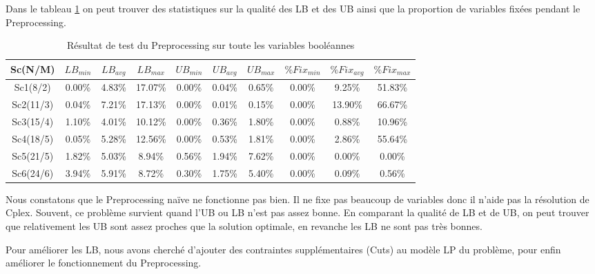\documentclass[twoside,fleqn]{EPURapport}
\begin{document}
Dans le tableau \ref{tab_pre} on peut trouver des statistiques sur la qualité des LB et des UB ainsi que la proportion de variables fixées pendant le Preprocessing.
\bigskip
\begin{table}[h]
    \centering
    \begin{tabular}{|c|c|c|c|c|c|c|c|c|c|}
    	\hline
    	Sc(N/M)	& $LB_{min}$ & $LB_{avg}$ & $LB_{max}$ & $UB_{min}$ & $UB_{avg}$ & $UB_{max}$ & $\%Fix_{min}$ & $\%Fix_{avg}$ & $\%Fix_{max}$\\ \hline
Sc1(8/2) & 0.00\%  &4.83\%  &17.07\%  &0.00\% & 0.04\%  &0.65\%  &0.00\%  &9.25\% &51.83\% \\ \hline
Sc2(11/3)&  0.04\% & 7.21\% & 17.13\% & 0.00\%&  0.01\% & 0.15\% & 0.00\% &13.90\% & 66.67\%\\ \hline
Sc3(15/4)&  1.10\% & 4.01\% & 10.12\% & 0.00\%&  0.36\% & 1.80\% & 0.00\% &0.88\% & 10.96\%\\ \hline
Sc4(18/5)&  0.05\% & 5.28\% & 12.56\% & 0.00\%&  0.53\% & 1.81\% & 0.00\% &2.86\% & 55.64\%\\ \hline
Sc5(21/5)&  1.82\% & 5.03\% & 8.94\%  &0.56\% & 1.94\%  &7.62\%  &0.00\%  &0.00\% &0.00\%\\ \hline
Sc6(24/6)&  3.94\% & 5.91\% & 8.72\%  &0.30\% & 1.75\%  &5.40\%  &0.00\%  &0.09\% &0.56\%\\ \hline
    \end{tabular}
    \label{tab_pre}
    \caption{Résultat de test du Preprocessing sur toute les variables booléannes}
\end{table}
\bigskip
Nous constatons que le Preprocessing naïve ne fonctionne pas bien. Il ne fixe pas beaucoup de variables donc il n'aide pas la résolution de Cplex. Souvent, ce problème survient quand l'UB ou LB n'est pas assez bonne. En comparant la qualité de LB et de UB, on peut trouver que relativement les UB sont assez proches que la solution optimale, en revanche les LB ne sont pas très bonnes. 

Pour améliorer les LB, nous avons cherché d'ajouter des contraintes supplémentaires (Cuts) au modèle LP du problème, pour enfin améliorer le fonctionnement du Preprocessing.
\end{document}
